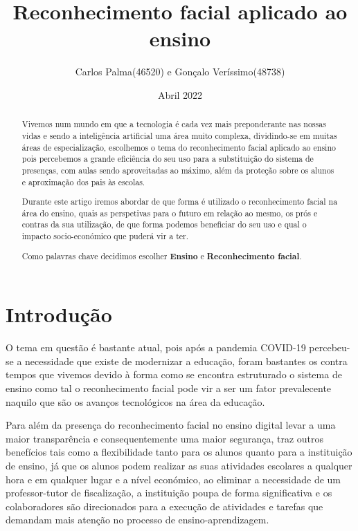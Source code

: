 \documentclass{article}
\title{Reconhecimento facial aplicado ao ensino}
\author{Carlos Palma(46520) e Gonçalo Veríssimo(48738) }
\date{Abril 2022}
\begin{document}
 

  

\maketitle 

  

\begin{abstract} 

Vivemos num mundo em que a tecnologia é cada vez mais preponderante nas nossas vidas e sendo a inteligência artificial uma área muito complexa, dividindo-se em muitas áreas de especialização, escolhemos o tema do reconhecimento facial aplicado ao ensino pois percebemos a grande eficiência do seu uso para a substituição do sistema de presenças, com aulas sendo aproveitadas ao máximo, além da proteção sobre os alunos e aproximação dos pais às escolas. 

Durante este artigo iremos abordar de que forma é utilizado o reconhecimento facial na área do ensino, quais as perspetivas para o futuro em relação ao mesmo, os prós e contras da sua utilização, de que forma podemos beneficiar do seu uso e qual o impacto socio-económico que puderá vir a ter. 

Como palavras chave decidimos escolher \textbf{Ensino} e \textbf{Reconhecimento facial}. 

\end{abstract} 

  

\section{Introdução} 

O tema em questão é bastante atual, pois após a pandemia COVID-19 percebeu-se a necessidade que existe de modernizar a educação, foram bastantes os contra tempos que vivemos devido à forma como se encontra estruturado o sistema de ensino como tal o reconhecimento facial pode vir a ser um fator prevalecente naquilo que são os avanços tecnológicos na área da educação. 

Para além da presença do reconhecimento facial no ensino digital levar a uma maior transparência e consequentemente uma maior segurança, traz outros benefícios tais como a flexibilidade tanto para os alunos quanto para a instituição de ensino, já que os alunos podem realizar as suas atividades escolares a qualquer hora e em qualquer lugar e a nível económico, ao eliminar a necessidade de um professor-tutor de fiscalização, a instituição poupa de forma significativa e os colaboradores são direcionados para a execução de atividades e tarefas que demandam mais atenção no processo de ensino-aprendizagem.  
\end{document}
